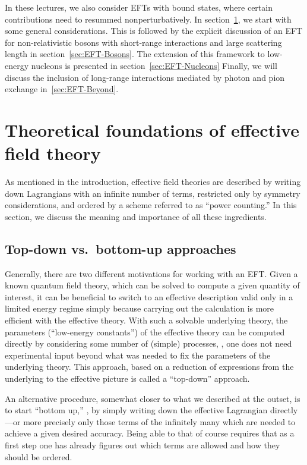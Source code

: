 In these lectures, we also consider EFTs with bound states, where 
certain contributions need to resummed nonperturbatively. In
section~\ref{sec:EFT-Basics}, we start with some general considerations.
This is followed by the explicit discussion of an EFT for 
non-relativistic bosons with short-range interactions 
and large scattering length in section~\ref{sec:EFT-Bosons}.  The extension of 
this framework 
to low-energy nucleons is presented in section~\ref{sec:EFT-Nucleons}
Finally, we will discuss the inclusion of long-range interactions
mediated by photon and pion exchange in~\ref{sec:EFT-Beyond}.

%
\section{Theoretical foundations of effective field theory}
\label{sec:EFT-Basics}

As mentioned in the introduction, effective field theories are described by 
writing down Lagrangians with an infinite number of terms, restricted only by 
symmetry considerations, and ordered by a scheme referred to as ``power 
counting.''  In this section, we discuss the meaning and importance of all 
these ingredients.

\subsection{Top-down vs.\ bottom-up approaches}

Generally, there are two different motivations for working with an EFT.  Given a 
known quantum field theory, which can be solved to compute a given quantity of 
interest, it can be beneficial to switch to an effective description valid only 
in a limited energy regime simply because carrying out the calculation is more 
efficient with the effective theory.  With such a solvable underlying theory, 
the parameters (``low-energy constants'') of the effective theory can be 
computed directly by considering some number of (simple) processes, \ie, one 
does not need experimental input beyond what was needed to fix the parameters 
of the underlying theory.  This approach, based on a reduction of expressions 
from the underlying to the effective picture is called a ``top-down'' approach.

An alternative procedure, somewhat closer to what we described at the outset, 
is to start ``bottom up,'' \ie, by simply writing down the effective 
Lagrangian directly---or more precisely only those terms of the infinitely 
many which are needed to achieve a given desired accuracy.  Being able to that 
of course requires that as a first step one has already figures out which terms 
are allowed and how they should be ordered.

